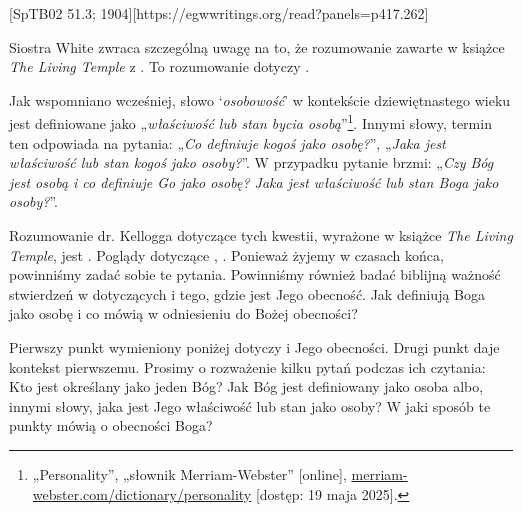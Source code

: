 [SpTB02 51.3; 1904][https://egwwritings.org/read?panels=p417.262]

Siostra White zwraca szczególną uwagę na to, że rozumowanie zawarte w książce \textit{The Living Temple}  z . To rozumowanie dotyczy .

Jak wspomniano wcześniej, słowo ‘\textit{osobowość}’ w kontekście dziewiętnastego wieku jest definiowane jako „\textit{właściwość lub stan bycia osobą}”\footnote{„Personality”, „słownik Merriam-Webster” [online], \href{https://www.merriam-webster.com/dictionary/personality}{merriam-webster.com/dictionary/personality} [dostęp: 19 maja 2025].}. Innymi słowy, termin ten odpowiada na pytania: „\textit{Co definiuje kogoś jako osobę?}”, „\textit{Jaka jest właściwość lub stan kogoś jako osoby?}”. W przypadku  pytanie brzmi: „\textit{Czy Bóg jest osobą i co definiuje Go jako osobę? Jaka jest właściwość lub stan Boga jako osoby?}”.

Rozumowanie dr. Kellogga dotyczące tych kwestii, wyrażone w książce \textit{The Living Temple}, jest . Poglądy dotyczące , . Ponieważ żyjemy w czasach końca, powinniśmy zadać sobie te pytania. Powinniśmy również badać biblijną ważność stwierdzeń w  dotyczących  i tego, gdzie jest Jego obecność. Jak  definiują Boga jako osobę i co mówią w odniesieniu do Bożej obecności?

Pierwszy punkt wymieniony poniżej dotyczy  i Jego obecności. Drugi punkt daje kontekst pierwszemu. Prosimy o rozważenie kilku pytań podczas ich czytania: Kto jest określany jako jeden Bóg? Jak Bóg jest definiowany jako osoba albo, innymi słowy, jaka jest Jego właściwość lub stan jako osoby? W jaki sposób te punkty mówią o obecności Boga?

